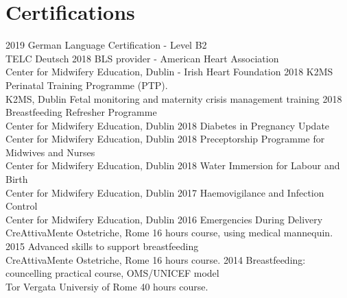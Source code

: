 \documentclass[11pt]{friggeri-cv}
\begin{document}
\section{Certifications}
\begin{entrylist}
  \entry
    {2019}
    {German Language Certification - Level B2}
    {\\TELC Deutsch}
    {\vspace{-10pt}}
  \entry
    {2018}
    {BLS provider - American Heart Association}
    {\\Center for Midwifery Education, Dublin - Irish Heart Foundation}
    {\vspace{-10pt}}
  \entry
    {2018}
    {K2MS Perinatal Training Programme (PTP).}
    {\\K2MS, Dublin}
    {Fetal monitoring and maternity crisis management training}
  \entry
    {2018}
    {Breastfeeding Refresher Programme}
    {\\Center for Midwifery Education, Dublin}
    {\vspace{-10pt}}
  \entry
    {2018}
    {Diabetes in Pregnancy Update}
    {\\Center for Midwifery Education, Dublin}
    {\vspace{-10pt}}
  \entry
    {2018}
    {Preceptorship Programme for Midwives and Nurses}
    {\\Center for Midwifery Education, Dublin}
    {\vspace{-10pt}}
  \entry
    {2018}
    {Water Immersion for Labour and Birth}
    {\\Center for Midwifery Education, Dublin}
    {\vspace{-10pt}}
  \entry
    {2017}
    {Haemovigilance and Infection Control}
    {\\Center for Midwifery Education, Dublin}
    {\vspace{-10pt}}
  \entry
    {2016}
    {Emergencies During Delivery}
    {\\CreAttivaMente Ostetriche, Rome}
    {16 hours course, using medical mannequin.}
  \entry
    {2015}
    {Advanced skills to support breastfeeding}
    {\\CreAttivaMente Ostetriche, Rome}
    {16 hours course.}
  \entry
    {2014}
    {Breastfeeding: councelling practical course, OMS/UNICEF model}
    {\\Tor Vergata Universiy of Rome}
    {40 hours course.}
\end{entrylist}
\newpage

\end{document}
